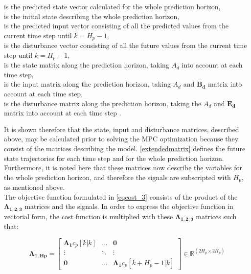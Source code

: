  \begin{minipage}[t]{0.70\textwidth}
 \vspace*{2mm}
 is the predicted state vector calculated for the whole prediction horizon, \\
 is the initial state describing the whole prediction horizon, \\
 is the predicted input vector consisting of all the predicted values from the current time step until $k = H_p-1$, \\
 is the disturbance vector consisting of all the future values from the current time step until $k = H_p-1$, \\
 is the state matrix along the prediction horizon, taking $A_d$ into account at each time step, \\
 is the input matrix along the prediction horizon, taking $A_d$ and $\bm{B_d}$ matrix into account at each time step, \\
 is the disturbance matrix along the prediction horizon, taking the $A_d$ and $\bm{E_d}$ matrix into account at each time step . \\ 
 \end{minipage}

It is shown therefore that the state, input and disturbance matrices, described above, may be calculated prior to solving the MPC optimization because they consist of the matrices describing the model. \eqref{extendedmatrix} defines the future state trajectories for each time step and for the whole prediction horizon. Furthermore, it is noted here that these matrices now describe the variables for the whole prediction horizon, and therefore the signals are subscripted with $H_p$, as mentioned above. 
\\
\newline
The objective function formulated in \eqref{eqcost_3} consists of the product of the $\bm{\Lambda_{1,2,3}}$ matrices and the signals. In order to express the objective function in vectorial form, the cost function is multiplied with these $\bm{\Lambda_{1,2,3}}$ matrices such that:

\begin{equation}
\bm{\Lambda_{1,Hp}} =
 \begin{bmatrix}
 \bm{\Lambda_1} c_p[k|k] & \hdots & \bm{0} \\
 \vdots & \ddots & \vdots\\
 \bm{0} & \hdots & \bm{\Lambda_1} c_p[k+H_p-1|k] 
 \end{bmatrix}
 \in \pmb{\mathbb{R}}^{(2 H_p \times 2 H_p)}
\end{equation} 


